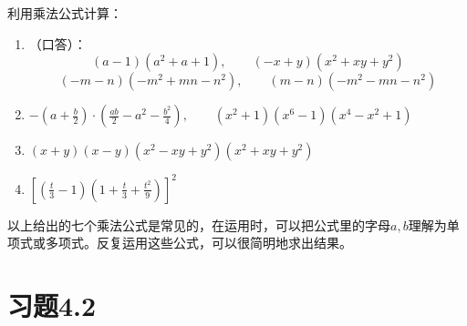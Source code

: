 \begin{ex}
  利用乘法公式计算：
\begin{enumerate}
    \item （口答）：
    \[(a-1)(a^2+a+1),\qquad (-x+y)(x^2+xy+y^2)\] 
    \[(-m-n)(-m^2+mn-n^2),\qquad (m-n)(-m^2-mn-n^2)\]
    \item $-\left(a+\frac{b}{2}\right)\cdot \left(\frac{ab}{2}-a^2-\frac{b^2}{4}\right),\qquad (x^2+1)(x^6-1)(x^4-x^2+1) $
    \item $(x+y)(x-y)(x^2-xy+y^2)(x^2+xy+y^2)$
    \item $\left[\left(\frac{t}{3}-1\right)\left(1+\frac{t}{3}+\frac{t^2}{9}\right) \right]^2$
\end{enumerate}
\end{ex}

以上给出的七个乘法公式是常见的，在运用时，可以把公式里的字母$a,b$理解为单项式或多项式。反复运用这些公式，可以很简明地求出结果。

\section*{习题4.2}


